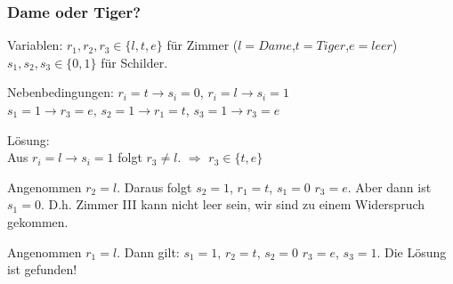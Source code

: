 \documentclass[hyperref={pdfpagelabels=false}]{beamer}
\begin{document}
\begin{frame}
\frametitle{Dame oder Tiger?}
\small  


\vspace{10pt}
Variablen: $r_1,r_2,r_3\in \{l,t,e\}$ für Zimmer ($l=Dame$,$t=Tiger$,$e=leer$)\\
\hspace{40pt} $s_1,s_2,s_3\in\{0,1\}$ für Schilder.

Nebenbedingungen: $r_i = t \rightarrow s_i=0$, $r_i=l \rightarrow s_i=1$\\
\hspace{80pt} $s_1=1 \rightarrow r_3= e$, $s_2=1 \rightarrow r_1= t$, $s_3=1 \rightarrow r_3= e$

Lösung:\\ \pause 
\hspace{40pt} Aus $r_i = l \rightarrow s_i=1$ folgt $r_3\not=l$. $\Rightarrow$ $r_3\in\{t,e\}$ \pause

\hspace{40pt} Angenommen $r_2 = l$. Daraus folgt $s_2=1$, $r_1=t$, $s_1=0$ $r_3=e$. Aber dann ist $s_1=0$. D.h. Zimmer III kann nicht leer sein, wir sind zu einem Widerspruch gekommen. \pause

\hspace{40pt} Angenommen $r_1 = l$. Dann gilt: $s_1=1$, $r_2=t$, $s_2=0$ $r_3=e$, $s_3 = 1$. Die Lösung ist gefunden!
\end{frame}
\end{document}
